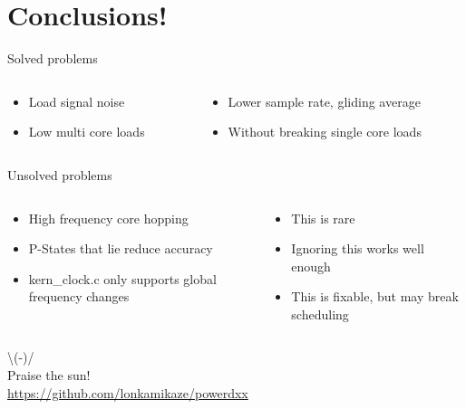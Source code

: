 \documentclass[aspectratio=169]{beamer}
\begin{document}
\section{Conclusions!}

\begin{frame}{Solved problems}
\begin{columns}[onlytextwidth]
\begin{column}{0.5\textwidth}
\begin{itemize}
\item<1-> Load signal noise
\item<3-> Low multi core loads
\end{itemize}
\end{column}
\begin{column}{0.5\textwidth}
\begin{itemize}
\item<2-> Lower sample rate, gliding average
\item<4-> Without breaking single core loads
\end{itemize}
\end{column}
\end{columns}
\end{frame}

\begin{frame}{Unsolved problems}
\begin{columns}[onlytextwidth]
\begin{column}{0.5\textwidth}
\begin{itemize}
\item<1-> High frequency core hopping
\item<3-> P-States that lie reduce accuracy
\item<5-> kern\_clock.c only supports global frequency changes
\end{itemize}
\end{column}
\begin{column}{0.5\textwidth}
\begin{itemize}
\item<2-> This is rare
\item<4-> Ignoring this works well enough
\item<6-> This is fixable, but may break scheduling
\end{itemize}
\end{column}
\end{columns}
\end{frame}

\begin{frame}
\centering
\textbackslash(-)/\\
Praise the sun!\\
\vspace{1cm}
\url{https://github.com/lonkamikaze/powerdxx}
\end{frame}
\end{document}
